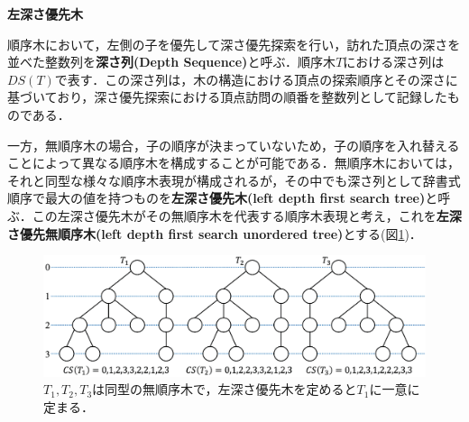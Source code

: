 \begin{define}{\bf 左深さ優先木}\par
  順序木において，左側の子を優先して深さ優先探索を行い，訪れた頂点の深さを並べた整数列を\textbf{深さ列(Depth Sequence)}と呼ぶ．順序木$T$における深さ列は$DS(T)$で表す．この深さ列は，木の構造における頂点の探索順序とその深さに基づいており，深さ優先探索における頂点訪問の順番を整数列として記録したものである．

  一方，無順序木の場合，子の順序が決まっていないため，子の順序を入れ替えることによって異なる順序木を構成することが可能である．無順序木においては，それと同型な様々な順序木表現が構成されるが，その中でも深さ列として辞書式順序で最大の値を持つものを\textbf{左深さ優先木(left depth first search tree)}と呼ぶ．この左深さ優先木がその無順序木を代表する順序木表現と考え，これを\textbf{左深さ優先無順序木(left depth first search unordered tree)}とする(図\ref{fig:left_dfs})．%
\end{define}

\begin{figure}[tb]
  \centering
  \includegraphics[scale=0.5]{fig/fig-left_dfs.eps}
  \caption{$T_1,T_2,T_3$は同型の無順序木で，左深さ優先木を定めると$T_1$に一意に定まる．}\label{fig:left_dfs}
\end{figure}
